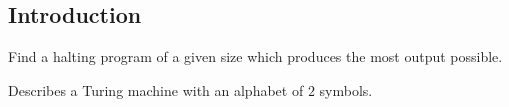 
\subsection{Introduction}

Find a halting program of a given size which produces the most output possible.

Describes a Turing machine with an alphabet of \(2\) symbols.


